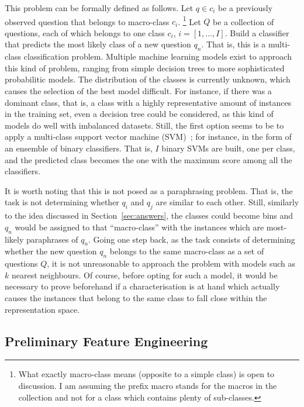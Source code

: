 \documentclass[11pt]{article}
\newcommand{\abc}[1]{\textcolor{magenta}{#1}}
\begin{document}
This problem can be formally defined as follows. Let $q\in c_i$ be a previously 
observed question that belongs to macro-class $c_i$.%
\footnote{What exactly macro-class means (opposite to a simple class) is open 
to discussion. I am assuming the prefix macro stands for the macros in the 
collection and not for a class which contains plenty of sub-classes.}
Let $Q$ be a collection of questions, each of which belongs to one class $c_i$, 
$i=[1,\ldots,I]$. Build a classifier that predicts the most likely class of a 
new question $q_n$. That is, this is a multi-class classification problem. 
Multiple machine learning models exist to approach this kind of problem, ranging 
from simple decision trees to more sophisticated probabilitic models. %
The distribution of the classes is currently unknown, which causes the selection 
of the best model difficult. For instance, if there was a dominant class, that 
is, a class with a highly representative amount of instances in the training 
set, even a decision tree could be considered, as this kind of models do well 
with imbalanced datasets. Still, the first option seems to be to apply a 
multi-class support vector machine (SVM)~\cite{Joachims:99}; for 
instance, in the form of an ensemble of binary classifiers. That is, $I$ binary 
SVMs are built, one per class, and the predicted class becomes the one with the 
maximum score among all the classifiers. 

It is worth noting that this is not posed as a paraphrasing problem. That is, 
the task is not determining whether $q_i$ and $q_j$ are similar to each other. 
Still, similarly to the idea discussed in Section~\ref{sec:answers}, the 
classes could become bins and $q_n$ would be assigned to that ``macro-class'' 
with the instances which are most-likely paraphrases of $q_n$. Going 
one step back, as the task consists of determining whether the new 
question $q_n$ belongs to the same macro-class as a set of questions $Q$, it is 
not unreasonable to approach the problem with models such as $k$ nearest 
neighbours. Of course, before opting for such a model, it would be necessary to 
prove beforehand if a characterisation is at hand which actually causes the 
instances that belong to the same class to fall close within the representation 
space. 

\subsection{Preliminary Feature Engineering}
\end{document}
